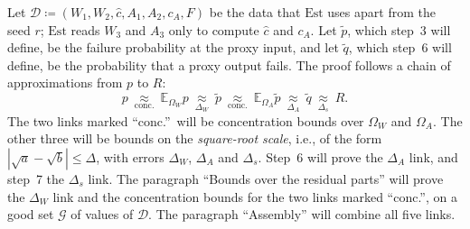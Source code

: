 \documentclass[10pt]{article}
\newcommand{\Dd}{\mathcal{D}}\newcommand{\Ee}{\mathcal{E}}
\newcommand{\Gg}{\mathcal{G}}\newcommand{\Hh}{\mathcal{H}}
\newcommand{\Est}{\mathrm{Est}}
\newcommand{\EE}{\mathbb{E}}
\newcommand{\chat}{\hat c}
\begin{document}
Let $\Dd\coloneqq (W_1,W_2,\chat,A_1,A_2,c_A,F)$ be the data that $\Est$
uses apart from the seed $r$; $\Est$ reads $W_3$ and $A_3$ only to compute $\chat$ and $c_A$. Let $\tilde p$, which step~3 will define, be the failure probability at
the proxy input, and let $\tilde q$, which step~6 will define, be the
probability that a proxy output fails. The proof follows a chain of approximations from $p$
to $R$:
\begin{equation}\label{eq:chain}p\ \underset{\text{conc.}}{\approx}\ \EE_{\Omega_W}p\ \underset{\Delta_W}{\approx}\ \tilde p
\ \underset{\text{conc.}}{\approx}\ \EE_{\Omega_A}\tilde p\ \underset{\Delta_A}{\approx}\ \tilde q
\ \underset{\Delta_s}{\approx}\ R.\end{equation}
The two links marked ``conc.''\ will be concentration bounds over
$\Omega_W$ and $\Omega_A$. The other three will be bounds on the
\emph{square-root scale}, i.e., of the form $|\sqrt a-\sqrt b|\le\Delta$, with errors $\Delta_W$, $\Delta_A$ and $\Delta_s$. Step~6 will prove the
$\Delta_A$ link, and step~7 the $\Delta_s$ link. The paragraph ``Bounds over
the residual parts'' will prove the $\Delta_W$ link and the concentration bounds for the two
links marked ``conc.'', on a good set $\Gg$ of values of $\Dd$. The paragraph ``Assembly''
will combine all five links.
\end{document}
